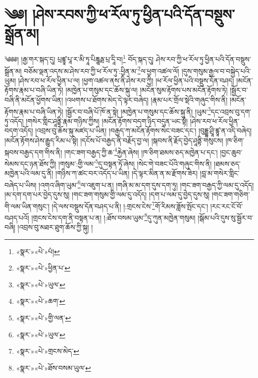 \chapter{༄༅། །ཤེས་རབས་ཀྱི་ཕ་རོལ་ཏུ་ཕྱིན་པའི་དོན་བསྡུས་སྒྲོན་མ།}༄༅༅། །རྒྱ་གར་སྐད་དུ། པྲཛྙཱ་པཱ་ར་མི་ཏཱ་པིཎྜཱརྠ་པྲ་དཱི་བ།\footnote{«སྣར་»«པེ་»པཾ།} བོད་སྐད་དུ། ཤེས་རབ་ཀྱི་ཕ་རོལ་ཏུ་ཕྱིན་པའི་དོན་བསྡུས་སྒྲོན་མ། བཅོམ་ལྡན་འདས་མ་ཤེས་རབ་ཀྱི་ཕ་རོལ་ཏུ་:ཕྱིན་མ་\footnote{«སྣར་»«པེ་»ཕྱིན་པ་}ལ་ཕྱག་འཚལ་ལོ། །དུས་གསུམ་རྒྱལ་བ་བསྐྱེད་པའི་ཡུམ། །ཤེས་རབ་ཕ་རོལ་ཕྱིན་པ་ལ། །ཕྱག་འཚལ་ནས་ནི་ཤེས་རབ་ཀྱི། །ཕ་རོལ་ཕྱིན་པའི་བསྡུས་དོན་བཤད། །མངོན་རྟོགས་རྣམ་པ་བཞི་ཡིན་ཏེ། །མཁྱེན་པ་གསུམ་དང་ཆོས་སྐུ་ལ། །མངོན་སུམ་རྟོགས་པས་མངོན་རྟོགས་ཏེ། །སྦྱོར་བ་བཞི་ནི་མངོན་ཕྱོགས་ཡིན། །འཕགས་པ་ཐོགས་མེད་དེ་ལྟར་བཞེད། །རྣམ་པར་གྲོལ་སྡེའི་གཞུང་གིས་ནི། །མངོན་རྟོགས་རྣམ་པ་བཞི་ཡིན་ཏེ། །སྦྱོར་བ་བཞི་པོ་ཁོ་ན་སྟེ། །མཁྱེན་པ་གསུམ་དང་ཆོས་སྐུ་ནི། །ཡུམ་\footnote{«སྣར་»«པེ་»ཡུལ་}དང་འབྲས་བུ་དག་ཏུ་འདོད། །གསེར་གླིང་ཤཱནྟི་རྣམ་གཉིས་ཀྱིས། །མངོན་རྟོགས་བདག་ཉིད་བདུན་ཡང་སྟེ། །ཤེས་རབ་ཕ་རོལ་ཕྱིན་བདག་འདོད། །འབྲས་བུ་ཆོས་སྐུ་མཛད་པ་ཡིན། །བརྒྱད་ཀ་མངོན་རྟོགས་སེང་བཟང་དང་། །བུདྡྷ་ཤྲཱི་ཛྙཱ་ན་འདི་བཞེད། །མངོན་རྟོགས་ཤེས་རྒྱུད་རིམ་པ་སྟེ། །དངོས་པོ་བརྒྱད་ནི་བརྗོད་བྱ་ལ། །སྐབས་ནི་རྗོད་བྱེད་ཤཱནྟི་གསུངས། །ཁ་ཅིག་སྐབས་བརྒྱད་དག་གིས་ནི། །གང་ཟག་བརྒྱད་ཀྱི་ཆ་\footnote{«སྣར་»«པེ་»ཆག་}རྐྱེན་ཞེས། །ཁ་ཅིག་ཐམས་ཅད་མཁྱེན་པ་དང་། །བྱང་ཆུབ་སེམས་དང་ཉན་ཐོས་ཀྱི། །གསུམ་:གྱི་ལམ་\footnote{«སྣར་»«པེ་»གྱི་ལན་}དུ་བསྟན་ཏོ་ཞེས། །སེང་གེ་བཟང་པོའི་གཞུང་གིས་ནི། །ཐམས་ཅད་མཁྱེན་པའི་ལམ་དུ་ནི། །གཉིས་ཀ་ཚང་བར་འདོད་པ་ཡིན། །དེ་ལྟར་མིན་ན་མ་རྫོགས་ཟེར། །བླ་མ་གསེར་གླིང་བཞེད་པ་ཡིས། །འགའ་ཞིག་ཡུམ་\footnote{«སྣར་»«པེ་»ཡུལ་}ལ་འཇུག་པ་ན། །གཞི་མ་མ་དག་དུས་དག་ཏུ། །གང་ཟག་བརྒྱད་ཀྱི་ལམ་དུ་འདོད། །མ་དག་དག་པར་བྱེད་དུས་སུ། །གང་ཟག་གསུམ་གྱི་ལམ་དུ་འདོད། །དག་པ་ལམ་དུ་བྱེད་དུས་སུ། །གང་ཟག་གཅིག་གི་ལམ་ཡིན་གསུང་། །དེ་ལས་བསྡུས་དོན་བཤད་པ་ནི། །:གྲངས་ངེས་\footnote{«སྣར་»«པེ་»གྲངས་མེད་}གོ་རིམས་ཟློས་སྤོང་དང་། །རང་རང་ངོ་བོ་བཤད་པའོ། །གྲངས་ངེས་དག་ནི་བསྟན་པ་ན། །:ཐོས་བསམ་ཡུམ་\footnote{«སྣར་»«པེ་»ཐོས་བསམ་ཡུལ་}དུ་ཀུན་མཁྱེན་གསུམ། །སྒོམ་པའི་དུས་སུ་སྦྱོར་བ་བཞི། །འབྲས་བུ་མཐར་ཐུག་ཆོས་ཀྱི་སྐུ། །
